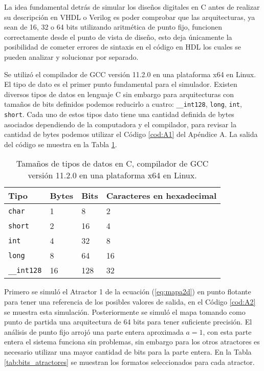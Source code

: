          La idea fundamental detrás de simular los diseños digitales en C antes de realizar su descripción en VHDL o Verilog es poder comprobar que las arquitecturas, ya sean de 16, 32 o 64 bits utilizando aritmética de punto fijo, funcionen correctamente desde el punto de vista de diseño, esto deja únicamente la posibilidad de cometer errores de sintaxis en el código en HDL los cuales se pueden analizar y solucionar por separado.

        Se utilizó el compilador de GCC versión 11.2.0 en una plataforma x64 en Linux. El tipo de dato es el primer punto fundamental para el simulador. Existen diversos tipos de datos en lenguaje C sin embargo para arquitecturas con tamaños de bits definidos podemos reducirlo a cuatro: \verb|__int128|, \verb|long|, \verb|int|, \verb|short|. Cada uno de estos tipos dato tiene una cantidad definida de bytes asociados dependiendo de la computadora y el compilador, para revisar la cantidad de bytes podemos utilizar el Código \ref{cod:A1} del Apéndice A. La salida del código se muestra en la Tabla \ref{tab:tipos_de_datos}.

        \begin{table}[htbp]
            \centering
            \caption{Tamaños de tipos de datos en C, compilador de GCC versión 11.2.0 en una plataforma x64 en Linux.}
            \begin{tabular}{|l|l|l|l|}
                \hline
                \rowcolor{lightgray} Tipo  & Bytes & Bits & Caracteres en hexadecimal\\
                \hline
                \verb|char|      & 1  & 8    & 2  \\
                \hline
                \verb|short|     & 2  & 16   & 4  \\
                \hline
                \verb|int|       & 4  & 32   & 8  \\
                \hline
                \verb|long|      & 8  & 64   & 16 \\
                \hline
                \verb|__int128|  & 16 & 128  & 32 \\
                \hline
            \end{tabular}
            \label{tab:tipos_de_datos}
        \end{table}
       
       Primero se simuló el Atractor 1 de la ecuación (\ref{eq:mapa2d}) en punto flotante para tener una referencia de los posibles valores de salida, en el Código \ref{cod:A2} se muestra esta simulación. Posteriormente se simuló el mapa tomando como punto de partida una arquitectura de 64 bits para tener suficiente precisión. El análisis de punto fijo arrojó una parte entera aproximada $a = 1$, con esta parte entera el sistema funciona sin problemas, sin embargo para los otros atractores es necesario utilizar una mayor cantidad de bits para la parte entera. En la Tabla \ref{tab:bits_atractores} se muestran los formatos seleccionados para cada atractor.
  
